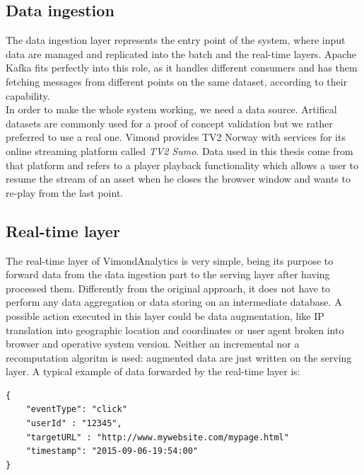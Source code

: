 \subsection{Data ingestion}
The data ingestion layer represents the entry point of the system, where input data are managed and replicated into the batch and the real-time layers. Apache Kafka fits perfectly into this role, as it handles different consumers and has them fetching messages from different points on the same dataset, according to their capability. \\
In order to make the whole system working, we need a data source. Artifical datasets are commonly used for a proof of concept validation but we rather preferred to use a real one. Vimond provides TV2 Norway with services for its online streaming platform called \textit{TV2 Sumo}. Data used in this thesis come from that platform and refers to a  player playback functionality which allows a user to resume the stream of an asset when he closes the browser window and wants to re-play from the last point.\\

\subsection{Real-time layer}
The real-time layer of VimondAnalytics is very simple, being its purpose to forward data from the data ingestion part to the serving layer after having processed them. Differently from the original approach, it does not have to perform any data aggregation or data storing on an intermediate database. A possible action executed in this layer could be data augmentation, like IP translation into geographic location and coordinates or user agent broken into browser and operative system version. Neither an incremental nor a recomputation algoritm is used: augmented data are just written on the serving layer. A typical example of data forwarded by the real-time layer is: 
\begin{listing}
\begin{verbatim}
{     
    "eventType": "click"
    "userId" : "12345",
    "targetURL" : "http://www.mywebsite.com/mypage.html"
    "timestamp": "2015-09-06-19:54:00"
}
\end{verbatim}
\caption{RealTime data example} 
\label{realtimedata-example}
\end{listing}

